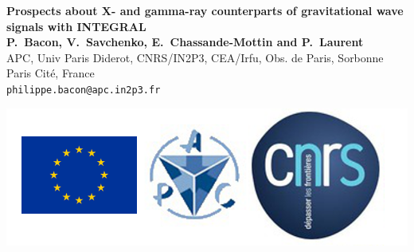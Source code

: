 \documentclass[a0,portrait]{a0poster}
\begin{document}


\begin{minipage}[b]{0.75\linewidth}
  \Huge \textbf{ 	Prospects about X- and gamma-ray counterparts of gravitational wave signals with INTEGRAL}\\[1cm] %
  \large \textbf{P.~Bacon, V.~Savchenko, E.~Chassande-Mottin and P.~Laurent}\\[1cm] %
  \normalsize APC, Univ Paris Diderot, CNRS/IN2P3, CEA/Irfu, Obs. de Paris, Sorbonne Paris Cit\'e, France\\
  \large \texttt{philippe.bacon@apc.in2p3.fr}\\
\end{minipage}
%
\begin{minipage}[b]{0.25\linewidth}
	\includegraphics[scale=.8]{logo.png}
\end{minipage}

\vspace{1cm} %

\end{document}
